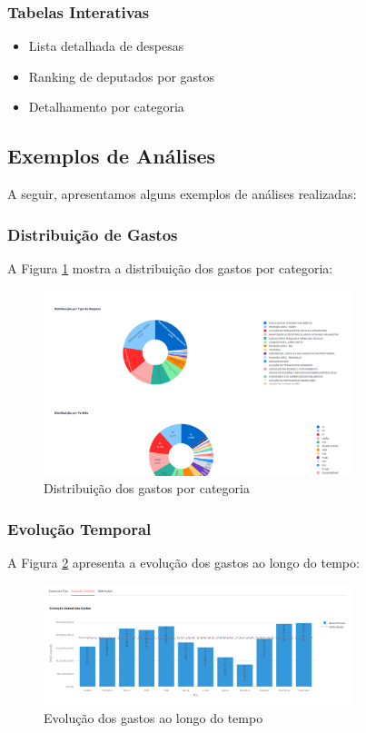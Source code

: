 \documentclass[12pt,a4paper]{article}
\begin{document}
\subsubsection{Tabelas Interativas}
\begin{itemize}
    \item Lista detalhada de despesas
    \item Ranking de deputados por gastos
    \item Detalhamento por categoria
\end{itemize}

\subsection{Exemplos de Análises}
A seguir, apresentamos alguns exemplos de análises realizadas:

\subsubsection{Distribuição de Gastos}
A Figura \ref{fig:distribuicao_gastos} mostra a distribuição dos gastos por categoria:

\begin{figure}[H]
\centering
\includegraphics[width=0.8\textwidth]{imagens/distribuicao_gastos.png}
\caption{Distribuição dos gastos por categoria}
\label{fig:distribuicao_gastos}
\end{figure}

\subsubsection{Evolução Temporal}
A Figura \ref{fig:evolucao_temporal} apresenta a evolução dos gastos ao longo do tempo:

\begin{figure}[H]
\centering
\includegraphics[width=0.8\textwidth]{imagens/evolucao_temporal.png}
\caption{Evolução dos gastos ao longo do tempo}
\label{fig:evolucao_temporal}
\end{figure}
\end{document}
